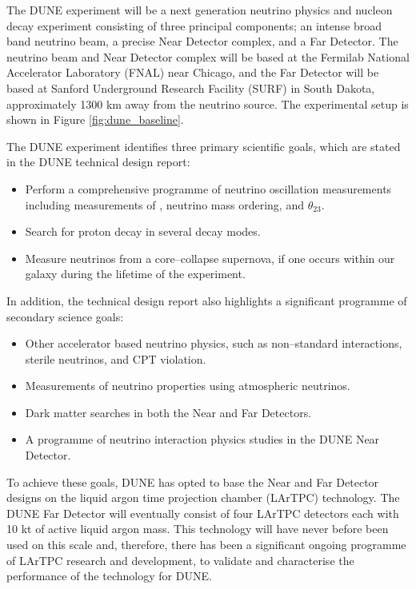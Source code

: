 The DUNE experiment will be a next generation neutrino physics and nucleon decay
experiment consisting of three principal components; an intense broad band 
neutrino beam, a precise Near Detector complex, and a Far Detector. The neutrino
beam and Near Detector complex will be based at the Fermilab National 
Accelerator Laboratory (FNAL) near Chicago, and the Far Detector will be based 
at Sanford Underground Research Facility (SURF) in South Dakota, approximately 
1300 km away from the neutrino source. The experimental setup is shown in Figure
\ref{fig:dune_baseline}. 

The DUNE experiment identifies three primary scientific goals, which are stated
in the DUNE technical design report\cite{Abi:2020evt}:
\begin{itemize}
	\item Perform a comprehensive programme of neutrino oscillation measurements
		including measurements of \dcp{}, neutrino mass ordering, and $\theta_{23}$.
	\item Search for proton decay in several decay modes.
	\item Measure neutrinos from a core--collapse supernova, if one occurs within 
		our galaxy during the lifetime of the experiment.
\end{itemize}
In addition, the technical design report also highlights a significant programme
of secondary science goals:
\begin{itemize}
	\item Other accelerator based neutrino physics, such as non--standard
		interactions, sterile neutrinos, and CPT violation.
	\item Measurements of neutrino properties using atmospheric neutrinos.
	\item Dark matter searches in both the Near and Far Detectors.
	\item A programme of neutrino interaction physics studies in the DUNE Near
		Detector.
\end{itemize}

To achieve these goals, DUNE has opted to base the Near and Far Detector designs
on the liquid argon time projection chamber (LArTPC) technology. The DUNE
Far Detector will eventually consist of four LArTPC detectors each with 10 kt 
of active liquid argon mass. This technology will have never before been used 
on this scale and, therefore, there has been a significant ongoing programme 
of LArTPC research and development, to validate and characterise the performance
of the technology for DUNE. 

